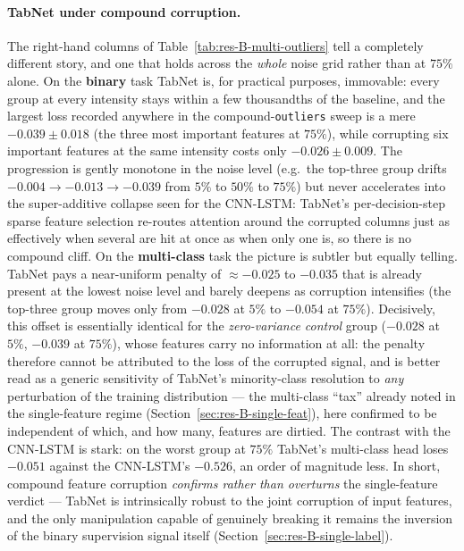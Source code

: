 \documentclass[../main.tex]{subfiles}
\begin{document}
\paragraph{TabNet under compound corruption.}
The right-hand columns of Table~\ref{tab:res-B-multi-outliers} tell a completely different story, and one that holds across the \emph{whole} noise grid rather than at $75\%$ alone. On the \textbf{binary} task TabNet is, for practical purposes, immovable: every group at every intensity stays within a few thousandths of the baseline, and the largest loss recorded anywhere in the compound-\texttt{outliers} sweep is a mere $-0.039 {\pm} 0.018$ (the three most important features at $75\%$), while corrupting six important features at the same intensity costs only $-0.026 {\pm} 0.009$. The progression is gently monotone in the noise level (e.g.\ the top-three group drifts $-0.004 \to -0.013 \to -0.039$ from $5\%$ to $50\%$ to $75\%$) but never accelerates into the super-additive collapse seen for the CNN-LSTM: TabNet's per-decision-step sparse feature selection re-routes attention around the corrupted columns just as effectively when several are hit at once as when only one is, so there is no compound cliff. On the \textbf{multi-class} task the picture is subtler but equally telling. TabNet pays a near-uniform penalty of $\approx -0.025$ to $-0.035$ that is already present at the lowest noise level and barely deepens as corruption intensifies (the top-three group moves only from $-0.028$ at $5\%$ to $-0.054$ at $75\%$). Decisively, this offset is essentially identical for the \emph{zero-variance control} group ($-0.028$ at $5\%$, $-0.039$ at $75\%$), whose features carry no information at all: the penalty therefore cannot be attributed to the loss of the corrupted signal, and is better read as a generic sensitivity of TabNet's minority-class resolution to \emph{any} perturbation of the training distribution --- the multi-class ``tax'' already noted in the single-feature regime (Section~\ref{sec:res-B-single-feat}), here confirmed to be independent of which, and how many, features are dirtied. The contrast with the CNN-LSTM is stark: on the worst group at $75\%$ TabNet's multi-class head loses $-0.051$ against the CNN-LSTM's $-0.526$, an order of magnitude less. In short, compound feature corruption \emph{confirms rather than overturns} the single-feature verdict --- TabNet is intrinsically robust to the joint corruption of input features, and the only manipulation capable of genuinely breaking it remains the inversion of the binary supervision signal itself (Section~\ref{sec:res-B-single-label}).
\end{document}
